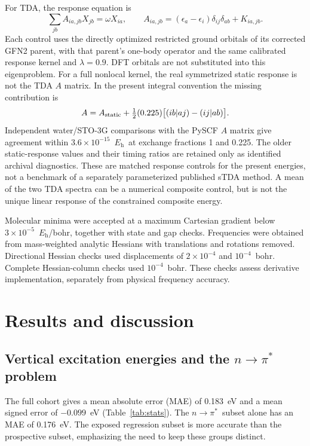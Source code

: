 \documentclass[11pt,a4paper]{article}
\newcommand{\npi}{\ensuremath{n\!\rightarrow\!\pi^*}}
\newcommand{\Eh}{\ensuremath{E_{\mathrm h}}}
\begin{document}
For TDA, the response equation is
\begin{equation}
 \sum_{jb} A_{ia,jb}X_{jb}=\omega X_{ia},\qquad
 A_{ia,jb}=(\epsilon_a-\epsilon_i)\delta_{ij}\delta_{ab}+K_{ia,jb}.
\end{equation}
Each control uses the directly optimized restricted ground orbitals of its corrected GFN2 parent, with that parent's one-body operator and the same calibrated response kernel and $\lambda=0.9$. DFT orbitals are not substituted into this eigenproblem. For a full nonlocal kernel, the real symmetrized static response is not the TDA $A$ matrix. In the present integral convention the missing contribution is
\begin{equation}
 A=A_{\rm static}+\tfrac12(0.225)\bigl[(ib|aj)-(ij|ab)\bigr].
\end{equation}
Independent water/STO-3G comparisons with the PySCF $A$ matrix give agreement within $3.6\times10^{-15}$~\Eh\ at exchange fractions 1 and 0.225. The older static-response values and their timing ratios are retained only as identified archival diagnostics. These are matched response controls for the present energies, not a benchmark of a separately parameterized published sTDA method.\cite{tda} A mean of the two TDA spectra can be a numerical composite control, but is not the unique linear response of the constrained composite energy.

Molecular minima were accepted at a maximum Cartesian gradient below $3\times10^{-5}$~\Eh/bohr, together with state and gap checks. Frequencies were obtained from mass-weighted analytic Hessians with translations and rotations removed. Directional Hessian checks used displacements of $2\times10^{-4}$ and $10^{-4}$~bohr. Complete Hessian-column checks used $10^{-4}$~bohr. These checks assess derivative implementation, separately from physical frequency accuracy.

\section{Results and discussion}
\subsection{Vertical excitation energies and the \texorpdfstring{\npi}{n to pi*} problem}

The full cohort gives a mean absolute error (MAE) of 0.183~eV and a mean signed error of $-0.099$~eV (Table~\ref{tab:stats}). The \npi\ subset alone has an MAE of 0.176~eV. The exposed regression subset is more accurate than the prospective subset, emphasizing the need to keep these groups distinct.
\end{document}
